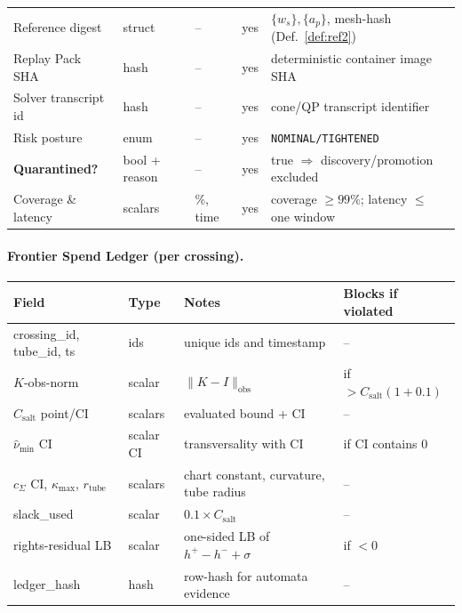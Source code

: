 \documentclass[10pt]{article}
\begin{document}
\begin{center}
\begin{tabularx}{\textwidth}{@{} l l l X X @{}}
Reference digest & struct & – & yes & $\{w_s\},\{a_p\}$, mesh-hash (Def.~\ref{def:ref2}) \\
Replay Pack SHA & hash & – & yes & deterministic container image SHA \\
Solver transcript id & hash & – & yes & cone/QP transcript identifier \\
Risk posture & enum & – & yes & \texttt{NOMINAL/TIGHTENED} \\
\textbf{Quarantined?} & bool + reason & – & yes & true $\Rightarrow$ discovery/promotion excluded \\
Coverage \& latency & scalars & \%, time & yes & coverage $\ge99\%$; latency $\le$ one window \\
\bottomrule
\end{tabularx}
\end{center}

\paragraph{Frontier Spend Ledger (per crossing).}
\begin{center}
\renewcommand{\arraystretch}{1.12}
\begin{tabularx}{\textwidth}{@{} l l X X @{}}
\toprule
\textbf{Field} & \textbf{Type} & \textbf{Notes} & \textbf{Blocks if violated} \\
\midrule
crossing\_id, tube\_id, ts & ids & unique ids and timestamp & – \\
$K$-obs-norm & scalar & $\|K{-}I\|_{\text{obs}}$ & if $>C_{\mathrm{salt}}(1{+}0.1)$ \\
$C_{\mathrm{salt}}$ point/CI & scalars & evaluated bound + CI & – \\
$\hat\nu_{\min}$ CI & scalar CI & transversality with CI & if CI contains $0$ \\
$c_\Sigma$ CI, $\kappa_{\max}$, $r_{\mathrm{tube}}$ & scalars & chart constant, curvature, tube radius & – \\
slack\_used & scalar & $0.1\times C_{\mathrm{salt}}$ & – \\
rights-residual LB & scalar & one-sided LB of $h^+-h^-+\sigma$ & if $<0$ \\
ledger\_hash & hash & row-hash for automata evidence & – \\
\bottomrule
\end{tabularx}
\end{center}
\end{document}
